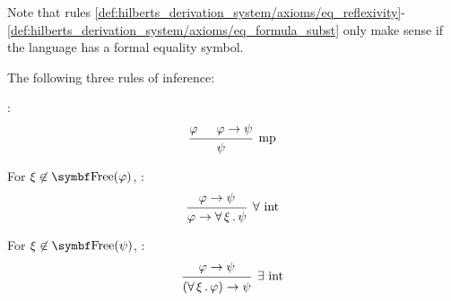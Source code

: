 \begin{definition}
\begin{RefList}
    Note that rules \eqref{def:hilberts_derivation_system/axioms/eq_reflexivity}-\eqref{def:hilberts_derivation_system/axioms/eq_formula_subst} only make sense if the language has a formal equality symbol.

     The following three rules of inference:
    \begin{DefEnum}
       :
      \begin{equation}\label{eq:def:hilberts_derivation_system/rules/modus_ponens}
        \begin{prooftree}
          \hypo{\varphi}
          \hypo{\varphi \to \psi}
          \infer2[mp]{\psi}
        \end{prooftree}
      \end{equation}

       For \( \xi \not\in \Bold{Free}(\varphi) \), :
      \begin{equation}\label{eq:def:hilberts_derivation_system/rules/forall_intro}
        \begin{prooftree}
          \hypo{\varphi \to \psi}
          \infer1[\( \forall \) \text{int}]{\varphi \to \Qnt{\forall}{\xi} \psi}
        \end{prooftree}
      \end{equation}

       For \( \xi \not\in \Bold{Free}(\psi) \), :
      \begin{equation}\label{eq:def:hilberts_derivation_system/rules/exists_intro}
        \begin{prooftree}
          \hypo{\varphi \to \psi}
          \infer1[\( \exists \) \text{int}]{(\Qnt{\forall}{\xi} \varphi) \to \psi}
        \end{prooftree}
      \end{equation}
    \end{DefEnum}
  \end{RefList}
\end{definition}

